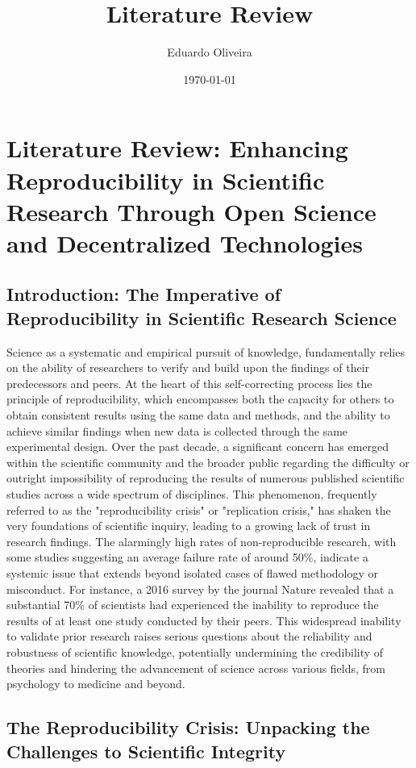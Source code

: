 \documentclass{article}
\title{Literature Review}
\author{Eduardo Oliveira}
\date{\today}
\begin{document}
\maketitle


\section{Literature Review: Enhancing Reproducibility in Scientific Research Through Open Science and Decentralized Technologies}

\subsection{Introduction: The Imperative of Reproducibility in Scientific Research Science}

Science as a systematic and empirical pursuit of knowledge, fundamentally relies on the ability of researchers to verify and build upon the findings of their predecessors and peers. At the heart of this self-correcting process lies the principle of reproducibility, which encompasses both the capacity for others to obtain consistent results using the same data and methods, and the ability to achieve similar findings when new data is collected through the same experimental design. Over the past decade, a significant concern has emerged within the scientific community and the broader public regarding the difficulty or outright impossibility of reproducing the results of numerous published scientific studies across a wide spectrum of disciplines. This phenomenon, frequently referred to as the "reproducibility crisis" or "replication crisis," has shaken the very foundations of scientific inquiry, leading to a growing lack of trust in research findings. The alarmingly high rates of non-reproducible research, with some studies suggesting an average failure rate of around 50\%, indicate a systemic issue that extends beyond isolated cases of flawed methodology or misconduct. For instance, a 2016 survey by the journal Nature revealed that a substantial 70\% of scientists had experienced the inability to reproduce the results of at least one study conducted by their peers. This widespread inability to validate prior research raises serious questions about the reliability and robustness of scientific knowledge, potentially undermining the credibility of theories and hindering the advancement of science across various fields, from psychology to medicine and beyond.

\subsection{The Reproducibility Crisis: Unpacking the Challenges to Scientific Integrity}
\end{document}
